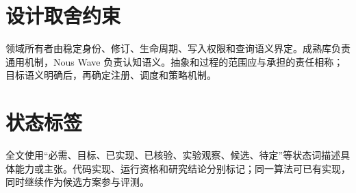 



\section{设计取舍约束}

领域所有者由稳定身份、修订、生命周期、写入权限和查询语义界定。成熟库负责通用机制，Nous Wave 负责认知语义。抽象和过程的范围应与承担的责任相称；目标语义明确后，再确定注册、调度和策略机制。

\section{状态标签}

全文使用“必需、目标、已实现、已核验、实验观察、候选、待定”等状态词描述具体能力或主张。代码实现、运行资格和研究结论分别标记；同一算法可已有实现，同时继续作为候选方案参与评测。

